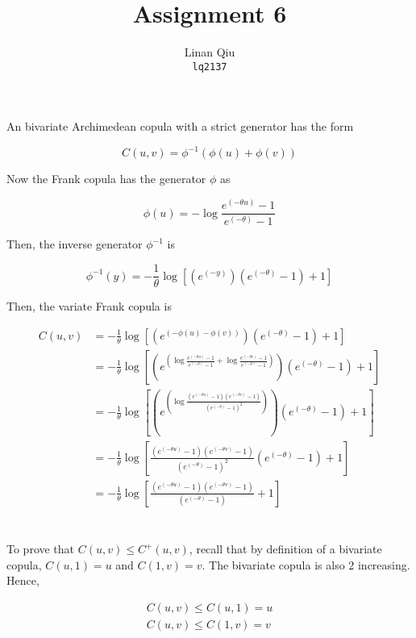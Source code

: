 \documentclass[11pt]{scrartcl}
\title{Assignment 6}
\author{Linan Qiu\\\texttt{lq2137}}
\begin{document}
\maketitle

\section{}

An bivariate Archimedean copula with a strict generator has the form

\[C(u, v) = \phi^{-1}(\phi(u) + \phi(v)) \]

Now the Frank copula has the generator $\phi$ as

\[\phi(u) = -\log{\frac{e^{(-\theta u)} - 1}{e^{(-\theta)} - 1}}\]

Then, the inverse generator $\phi^{-1}$ is

\[\phi^{-1}(y) = -\frac{1}{\theta} \log{\left[(e^{(-y)})(e^{(-\theta)} - 1) + 1\right]}\]

Then, the variate Frank copula is

\begin{align*}
C(u,v) &= -\frac{1}{\theta} \log{\left[(e^{(-\phi(u) - \phi(v))})(e^{(-\theta)} - 1) + 1\right]} \\
&= -\frac{1}{\theta} \log{\left[(e^{(\log{\frac{e^{(-\theta u)} - 1}{e^{(-\theta)} - 1}} + \log{\frac{e^{(-\theta v)} - 1}{e^{(-\theta)} - 1}})})(e^{(-\theta)} - 1) + 1\right]} \\
&= -\frac{1}{\theta} \log{\left[(e^{(\log{\frac{(e^{(-\theta u)} - 1)(e^{(-\theta v)} - 1)}{(e^{(-\theta)} - 1)^2}} )})(e^{(-\theta)} - 1) + 1\right]} \\
&= -\frac{1}{\theta} \log{\left[\frac{(e^{(-\theta u)} - 1)(e^{(-\theta v)} - 1)}{(e^{(-\theta)} - 1)^2}  (e^{(-\theta)} - 1) + 1\right]} \\
&= -\frac{1}{\theta} \log{\left[\frac{(e^{(-\theta u)} - 1)(e^{(-\theta v)} - 1)}{(e^{(-\theta)} - 1)} + 1\right]}
\end{align*}

\section{}

To prove that $C(u,v) \leq C^+ (u,v)$, recall that by definition of a bivariate copula, $C(u,1) = u$ and $C(1,v) = v$. The bivariate copula is also 2 increasing. Hence,

\begin{align*}
C(u, v) \leq C(u, 1) = u \\
C(u, v) \leq C(1, v) = v \\
\end{align*}
\end{document}
